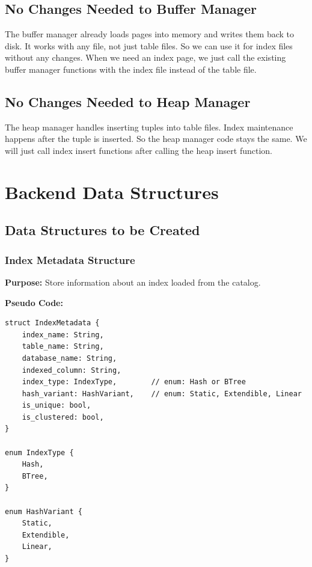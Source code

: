 \documentclass[11pt,a4paper]{article}
\begin{document}
\subsection{No Changes Needed to Buffer Manager}

The buffer manager already loads pages into memory and writes them back to disk. It works with any file, not just table files. So we can use it for index files without any changes. When we need an index page, we just call the existing buffer manager functions with the index file instead of the table file.

\subsection{No Changes Needed to Heap Manager}

The heap manager handles inserting tuples into table files. Index maintenance happens after the tuple is inserted. So the heap manager code stays the same. We will just call index insert functions after calling the heap insert function.

\section{Backend Data Structures}

\subsection{Data Structures to be Created}

\subsubsection{Index Metadata Structure}

\textbf{Purpose:} Store information about an index loaded from the catalog.

\textbf{Pseudo Code:}
\begin{lstlisting}
struct IndexMetadata {
    index_name: String,
    table_name: String,
    database_name: String,
    indexed_column: String,
    index_type: IndexType,        // enum: Hash or BTree
    hash_variant: HashVariant,    // enum: Static, Extendible, Linear
    is_unique: bool,
    is_clustered: bool,
}

enum IndexType {
    Hash,
    BTree,
}

enum HashVariant {
    Static,
    Extendible,
    Linear,
}
\end{lstlisting}
\end{document}
